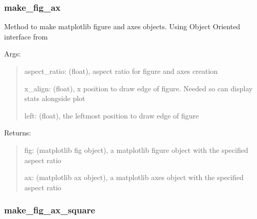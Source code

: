 \documentclass[letterpaper,10pt,english]{sphinxmanual}
\begin{document}
\subsubsection{make\_fig\_ax}
\label{\detokenize{api/mastml.plots.make_fig_ax:make-fig-ax}}\label{\detokenize{api/mastml.plots.make_fig_ax::doc}}

\begin{fulllineitems}
\label{\detokenize{api/mastml.plots.make_fig_ax:mastml.plots.make_fig_ax}}
Method to make matplotlib figure and axes objects. Using Object Oriented interface from 

Args:
\begin{quote}

aspect\_ratio: (float), aspect ratio for figure and axes creation

x\_align: (float), x position to draw edge of figure. Needed so can display stats alongside plot

left: (float), the leftmost position to draw edge of figure
\end{quote}

Returns:
\begin{quote}

fig: (matplotlib fig object), a matplotlib figure object with the specified aspect ratio

ax: (matplotlib ax object), a matplotlib axes object with the specified aspect ratio
\end{quote}

\end{fulllineitems}



\subsubsection{make\_fig\_ax\_square}
\label{\detokenize{api/mastml.plots.make_fig_ax_square:make-fig-ax-square}}\label{\detokenize{api/mastml.plots.make_fig_ax_square::doc}}
\end{document}
